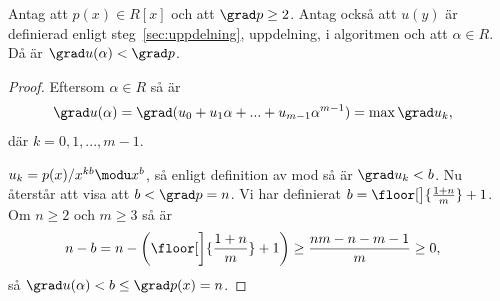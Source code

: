 \begin{lemma}
  \label{lemma:1}
  Antag att $p(x) \in R[x]$ och att $\grad p \geq 2$. Antag också att $u(y)$ är
  definierad enligt steg~\ref{sec:uppdelning}, uppdelning, i algoritmen och att
  $\alpha \in R$. Då är $\grad u(\alpha) < \grad p$.
\end{lemma}
\begin{proof}
  Eftersom $\alpha \in R$ så är
  \begin{align*}
    \grad u(\alpha) &= \grad (u_0 + u_1 \alpha + ... + u_{m-1}\alpha^{m-1}) = \max \grad u_k,
  \end{align*}
  där $k={0,1,...,m-1}$.

  \bigskip\noindent
  $u_k = p(x)/x^{k b} \modu x^b$, så enligt definition av mod så är $\grad u_k
  < b$. Nu återstår att visa att $b < \grad p = n$. Vi har definierat $b =
  \floor[\big]{\frac{1 + n}{m}} + 1$. Om $n \geq 2$ och $m \geq 3$ så är
  \begin{align*}
    n-b &= n - \left( \floor[\bigg]{\frac{1 + n}{m}} + 1 \right) \geq \frac{nm-n-m-1}{m} \geq 0,
  \end{align*}
  så $\grad u(\alpha) < b \leq \grad p(x) = n$.
\end{proof}

